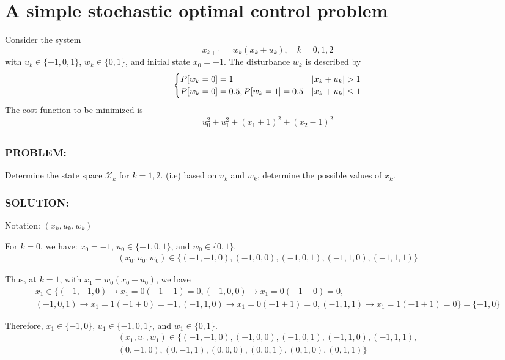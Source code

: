 \documentclass[]{article}
\newcommand{\Problem}{\subsubsection*{\textbf{PROBLEM:}}}
\newcommand{\Solution}{\subsubsection*{\textbf{SOLUTION:}}}
\begin{document}
\newpage
\section{A simple stochastic optimal control problem}
Consider the system\[
    x_{k+1} = w_{k}(x_k + u_k), \quad k = 0,1,2
\] with $u_k \in \{-1,0,1\}$, $w_k \in \{0,1\}$, and initial state $x_0 = -1$.
The disturbance $w_k$ is described by\[
    \begin{cases}
        P[w_k = 0] = 1 & \abs{x_k + u_k} > 1\\
        P[w_k = 0] = 0.5, P[w_k = 1] = 0.5 &\abs{x_k + u_k} \leq 1
    \end{cases}
\]
The cost function to be minimized is \[
    u_0^2 + u_1^2 + (x_1 + 1)^2 + (x_2 - 1)^2
\]

\subsection{}
\Problem
Determine the state space $\mathcal{X}_k$ for $k = 1,2$.
(i.e) based on $u_k$ and $w_k$, determine the possible values of $x_k$.
\Solution
Notation: $(x_k,u_k,w_k)$

For $k=0$, we have: $x_0 = -1$, $u_0\in \{-1,0,1\}$, and $w_0 \in \{0,1\}$.
\begin{multline}
    (x_0,u_0,w_0) \in \{
        (-1,-1,0), 
        (-1,0,0),
        (-1,0,1),
        (-1,1,0),
        (-1,1,1)
    \}
\end{multline}

Thus, at $k=1$, with $x_1 = w_0 (x_0 + u_0)$, we have
\begin{multline}
    x_1 \in \{
        (-1,-1,0) \to x_1 = 0(-1-1) = 0, 
        (-1,0,0) \to x_1 = 0(-1+0) = 0,\\
        (-1,0,1) \to x_1 = 1(-1+0) = -1,
        (-1,1,0) \to x_1 = 0(-1+1) = 0,
        (-1,1,1) \to x_1 = 1(-1+1) = 0
    \} = \{-1,0\}
\end{multline}

Therefore, $x_1 \in \{-1,0\}$, $u_1 \in \{-1,0,1\}$, and $w_1 \in \{0,1\}$.
\begin{multline}
    (x_1,u_1,w_1) \in \{
        (-1,-1,0), 
        (-1,0,0),
        (-1,0,1),
        (-1,1,0),
        (-1,1,1),\\
        (0,-1,0), 
        (0,-1,1),
        (0,0,0),
        (0,0,1),
        (0,1,0),
        (0,1,1)
    \}
\end{multline}
\end{document}
